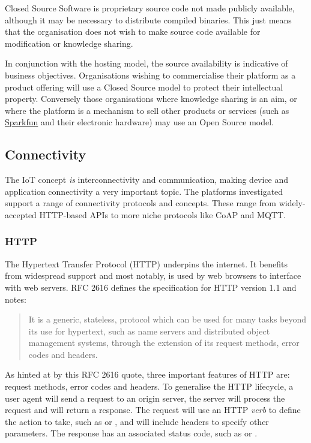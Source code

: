       Closed Source Software is proprietary source code not made publicly available, although it may be necessary to distribute compiled binaries. This just means that the organisation does not wish to make source code available for modification or knowledge sharing. 

      In conjunction with the hosting model, the source availability is indicative of business objectives. Organisations wishing to commercialise their platform as a product offering will use a Closed Source model to protect their intellectual property. Conversely those organisations where knowledge sharing is an aim, or where the platform is a mechanism to sell other products or services (such as \href{https://data.sparkfun.com/}{Sparkfun} and their electronic hardware) may use an Open Source model.

    \subsection{Connectivity}
      The IoT concept \emph{is} interconnectivity and communication, making device and application connectivity a very important topic. The platforms investigated support a range of connectivity protocols and concepts. These range from widely-accepted HTTP-based APIs to more niche protocols like CoAP and MQTT.

      \subsubsection{HTTP}
        The Hypertext Transfer Protocol (HTTP) underpins the internet. It benefits from widespread support and most notably, is used by web browsers to interface with web servers. RFC 2616 \citep{rfc2616} defines the specification for HTTP version 1.1 and notes:

          \begin{quote}It is a generic, stateless, protocol which can be used for many tasks beyond its use for hypertext, such as name servers and distributed object management systems, through the extension of its request methods, error codes and headers.\end{quote}

        As hinted at by this RFC 2616 quote, three important features of HTTP are: request methods, error codes and headers. To generalise the HTTP lifecycle, a user agent will send a request to an origin server, the server will process the request and will return a response. The request will use an HTTP \emph{verb} to define the action to take, such as  or , and will include headers to specify other parameters. The response has an associated status code, such as  or .

